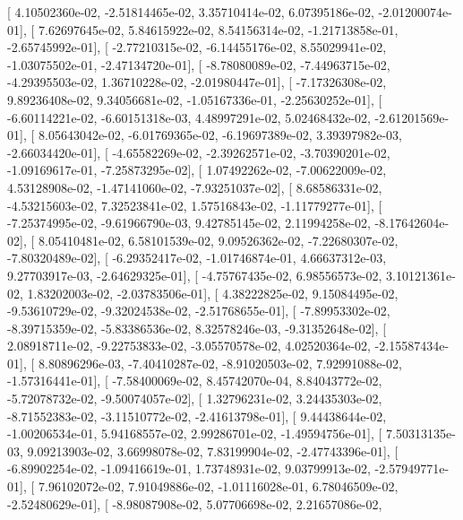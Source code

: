 \documentclass{article}
\begin{document}
       [  4.10502360e-02,  -2.51814465e-02,   3.35710414e-02,
          6.07395186e-02,  -2.01200074e-01],
       [  7.62697645e-02,   5.84615922e-02,   8.54156314e-02,
         -1.21713858e-01,  -2.65745992e-01],
       [ -2.77210315e-02,  -6.14455176e-02,   8.55029941e-02,
         -1.03075502e-01,  -2.47134720e-01],
       [ -8.78080089e-02,  -7.44963715e-02,  -4.29395503e-02,
          1.36710228e-02,  -2.01980447e-01],
       [ -7.17326308e-02,   9.89236408e-02,   9.34056681e-02,
         -1.05167336e-01,  -2.25630252e-01],
       [ -6.60114221e-02,  -6.60151318e-03,   4.48997291e-02,
          5.02468432e-02,  -2.61201569e-01],
       [  8.05643042e-02,  -6.01769365e-02,  -6.19697389e-02,
          3.39397982e-03,  -2.66034420e-01],
       [ -4.65582269e-02,  -2.39262571e-02,  -3.70390201e-02,
         -1.09169617e-01,  -7.25873295e-02],
       [  1.07492262e-02,  -7.00622009e-02,   4.53128908e-02,
         -1.47141060e-02,  -7.93251037e-02],
       [  8.68586331e-02,  -4.53215603e-02,   7.32523841e-02,
          1.57516843e-02,  -1.11779277e-01],
       [ -7.25374995e-02,  -9.61966790e-03,   9.42785145e-02,
          2.11994258e-02,  -8.17642604e-02],
       [  8.05410481e-02,   6.58101539e-02,   9.09526362e-02,
         -7.22680307e-02,  -7.80320489e-02],
       [ -6.29352417e-02,  -1.01746874e-01,   4.66637312e-03,
          9.27703917e-03,  -2.64629325e-01],
       [ -4.75767435e-02,   6.98556573e-02,   3.10121361e-02,
          1.83202003e-02,  -2.03783506e-01],
       [  4.38222825e-02,   9.15084495e-02,  -9.53610729e-02,
         -9.32024538e-02,  -2.51768655e-01],
       [ -7.89953302e-02,  -8.39715359e-02,  -5.83386536e-02,
          8.32578246e-03,  -9.31352648e-02],
       [  2.08918711e-02,  -9.22753833e-02,  -3.05570578e-02,
          4.02520364e-02,  -2.15587434e-01],
       [  8.80896296e-03,  -7.40410287e-02,  -8.91020503e-02,
          7.92991088e-02,  -1.57316441e-01],
       [ -7.58400069e-02,   8.45742070e-04,   8.84043772e-02,
         -5.72078732e-02,  -9.50074057e-02],
       [  1.32796231e-02,   3.24435303e-02,  -8.71552383e-02,
         -3.11510772e-02,  -2.41613798e-01],
       [  9.44438644e-02,  -1.00206534e-01,   5.94168557e-02,
          2.99286701e-02,  -1.49594756e-01],
       [  7.50313135e-03,   9.09213903e-02,   3.66998078e-02,
          7.83199904e-02,  -2.47743396e-01],
       [ -6.89902254e-02,  -1.09416619e-01,   1.73748931e-02,
          9.03799913e-02,  -2.57949771e-01],
       [  7.96102072e-02,   7.91049886e-02,  -1.01116028e-01,
          6.78046509e-02,  -2.52480629e-01],
       [ -8.98087908e-02,   5.07706698e-02,   2.21657086e-02,
\end{document}

